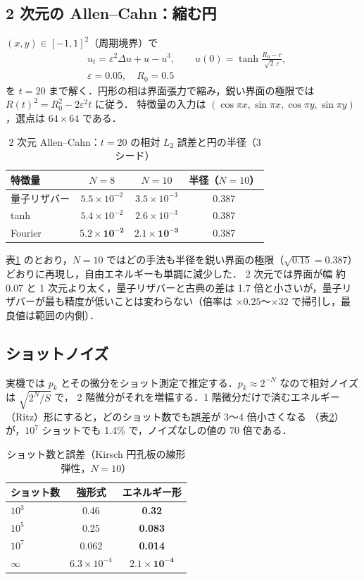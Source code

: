 \documentclass[uplatex,dvipdfmx,a4paper,10pt,twocolumn]{jsarticle}
\theoremstyle{definition}
\begin{document}
\subsection{2 次元の Allen--Cahn：縮む円}
$(x,y)\in[-1,1]^2$（周期境界）で
\begin{equation}
\begin{aligned}
  &u_t=\varepsilon^2\Delta u+u-u^3,\qquad u(0)=\tanh\frac{R_0-r}{\sqrt2\,\varepsilon},\\
  &\varepsilon=0.05,\quad R_0=0.5
\end{aligned}
\end{equation}
を $t=20$ まで解く．円形の相は界面張力で縮み，鋭い界面の極限では $R(t)^2=R_0^2-2\varepsilon^2t$ に従う．
特徴量の入力は $(\cos\pi x,\sin\pi x,\cos\pi y,\sin\pi y)$，選点は $64\times64$ である．
\begin{table}[t]
\centering\small
\caption{2 次元 Allen--Cahn：$t=20$ の相対 $L_2$ 誤差と円の半径（3 シード）}\label{tab:ac2d}
\begin{tabular}{lccc}
\toprule
特徴量 & $N=8$ & $N=10$ & 半径（$N=10$）\\
\midrule
量子リザバー & $5.5\times10^{-2}$ & $3.5\times10^{-3}$ & 0.387\\
tanh & $5.4\times10^{-2}$ & $2.6\times10^{-3}$ & 0.387\\
Fourier & $\bm{5.2\times10^{-2}}$ & $\bm{2.1\times10^{-3}}$ & 0.387\\
\bottomrule
\end{tabular}
\end{table}
表\ref{tab:ac2d} のとおり，$N=10$ ではどの手法も半径を鋭い界面の極限（$\sqrt{0.15}=0.387$）どおりに再現し，自由エネルギーも単調に減少した．
2 次元では界面が幅 約 0.07 と 1 次元より太く，量子リザバーと古典の差は 1.7 倍と小さいが，量子リザバーが最も精度が低いことは変わらない（倍率は $\times0.25$〜$\times32$ で掃引し，最良値は範囲の内側）．

\subsection{ショットノイズ}
実機では $p_k$ とその微分をショット測定で推定する．$p_k\approx2^{-N}$ なので相対ノイズは $\sqrt{2^N/S}$ で，
2 階微分がそれを増幅する．1 階微分だけで済むエネルギー（Ritz）形にすると，どのショット数でも誤差が 3〜4 倍小さくなる
（表\ref{tab:shot}）が，$10^7$ ショットでも 1.4\% で，ノイズなしの値の 70 倍である．
\begin{table}[t]
\centering\small
\caption{ショット数と誤差（Kirsch 円孔板の線形弾性，$N=10$）}\label{tab:shot}
\begin{tabular}{lcc}
\toprule
ショット数 & 強形式 & エネルギー形\\
\midrule
$10^3$ & 0.46 & \textbf{0.32}\\
$10^5$ & 0.25 & \textbf{0.083}\\
$10^7$ & 0.062 & \textbf{0.014}\\
$\infty$ & $6.3\times10^{-4}$ & $\bm{2.1\times10^{-4}}$\\
\bottomrule
\end{tabular}
\end{table}
\end{document}
